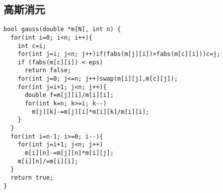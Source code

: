 \subsection{高斯消元}
\begin{lstlisting}
bool gauss(double *m[N], int n) {
  for(int i=0; i<n; i++){
    int c=i;
    for(int j=i; j<n; j++)if(fabs(m[j][i])>fabs(m[c][i]))c=j;
    if (fabs(m[c][i]) < eps)
      return false;
    for(int j=0; j<=n; j++)swap(m[i][j],m[c][j]);
    for(int j=i+1; j<n; j++){
      double f=m[j][i]/m[i][i];
      for(int k=n; k>=i; k--)
        m[j][k]-=m[j][i]*m[i][k]/m[i][i];
    }
  }
  for(int i=n-1; i>=0; i--){
    for(int j=i+1; j<n; j++)
      m[i][n]-=m[j][n]*m[i][j];
    m[i][n]/=m[i][i];
  }
  return true;
}
\end{lstlisting}
